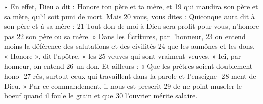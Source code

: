 « En effet, Dieu a dit : Honore ton père et ta mère, et	 
19	 	qui maudira son père et sa mère, qu'il soit puni de mort. Mais	 
20	 	vous, vous dites : Quiconque aura dit à son père et à sa mère :	 
21	 	Tout don de moi à Dieu sera profit pour vous, n'honore pas	 
22	 	son père ou sa mère. » Dans les Écritures, par l'honneur,	 
23	 	on entend moins la déférence des salutations et des civilités	 
24	 	que les aumônes et les dons. « Honore », dit l'apôtre, « les	 
25	 	veuves qui sont vraiment veuves. » Ici, par honneur, on entend	 
26	 	un don. Et ailleurs : « Que les prêtres soient doublement hono-	 
27	 	rés, surtout ceux qui travaillent dans la parole et l'enseigne-	 
28	 	ment de Dieu. » Par ce commandement, il nous est prescrit	 
29	 	de ne point museler le boeuf quand il foule le grain et que	 
30	 	l'ouvrier mérite salaire.
